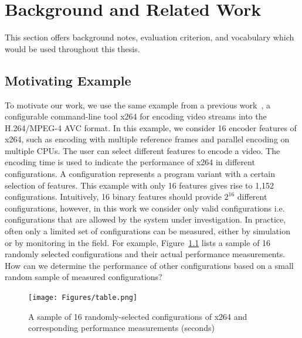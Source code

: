 \chapter{Background and Related Work}
\label{chapter:background}

This section offers background notes, evaluation criterion, and vocabulary which would be used throughout this thesis.

\section{Motivating Example}
To motivate our work, we use the same example from a previous work~\cite{guo2013variability}, a configurable
command-line tool x264 for encoding video streams into the H.264/MPEG-4 AVC format.
In this example, we consider 16 encoder features of x264, such as encoding with multiple
reference frames and parallel encoding on multiple CPUs. The user can select
different features to encode a video. The encoding time is used to indicate the performance
of x264 in different configurations. A configuration represents a program variant with
a certain selection of features. This example with only 16 features gives rise to 1,152
configurations. Intuitively, 16 binary features should provide $2^{16}$ different configurations,
however, in this work we consider only valid configurations i.e. configurations that are
allowed by the system under investigation.
In practice, often only a limited set of configurations can be measured, either by simulation
or by monitoring in the field. For example, Figure~\ref{fig:chap1_random_sample} lists a sample of 16 randomly selected
configurations and their actual performance measurements. How can we determine
the performance of other configurations based on a small random sample of measured configurations?
\begin{figure}[!htbp]
    \centering
    \texttt{[image: Figures/table.png]}
    \caption[Table with randomly selected configurations]{A sample of 16 randomly-selected configurations of x264 and corresponding
performance measurements (seconds)}
    \label{fig:chap1_random_sample}
\end{figure}

